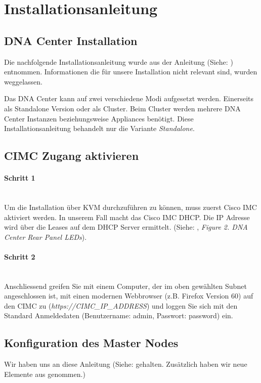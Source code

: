 \section{Installationsanleitung}

\subsection{DNA Center Installation}
Die nachfolgende Installationsanleitung wurde aus der Anleitung (Siehe: \cite{cisco-dna-installation-guide-1-2-chapter-configure}) entnommen. Informationen die für unsere Installation nicht relevant sind, wurden weggelassen. 

Das DNA Center kann auf zwei verschiedene Modi aufgesetzt werden. Einerseits als Standalone Version oder als Cluster. Beim Cluster werden mehrere DNA Center Instanzen beziehungsweise Appliances benötigt. Diese Installationsanleitung behandelt nur die Variante \textit{Standalone}.

\subsection{CIMC Zugang aktivieren}
\paragraph{Schritt 1}
\label{installguide-cimc-step1}
~\\
Um die Installation über KVM durchzuführen zu können, muss zuerst Cisco IMC aktiviert werden. In unserem Fall macht das Cisco IMC DHCP. Die IP Adresse wird über die Leases auf dem DHCP Server ermittelt. (Siehe: \cite{cisco-dna-installation-guide-1-2-chapter-install}, \textit{Figure 2. DNA Center Rear Panel LEDs}). 

\paragraph{Schritt 2}
~\\
Anschliessend greifen Sie mit einem Computer, der im oben gewählten Subnet angeschlossen ist, mit einen modernen Webbrowser (z.B. Firefox Version 60) auf den CIMC zu (\textit{https://CIMC\_IP\_ADDRESS}) und loggen Sie sich mit den Standard Anmeldedaten (Benutzername: admin, Passwort: password) ein. 

\subsection{Konfiguration des Master Nodes}
Wir haben uns an diese Anleitung (Siehe: \cite{cisco-dna-installation-guide} gehalten. Zusätzlich haben wir neue Elemente aus \cite{cisco-dna-installation-guide-1-2-chapter-install} genommen.)
